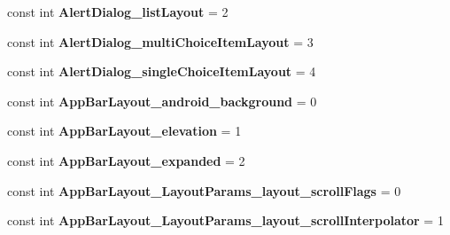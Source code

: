 \begin{DoxyCompactItemize}
const int {\bfseries Alert\+Dialog\+\_\+list\+Layout} = 2
\item 
\mbox{\label{class_pinned_app_1_1_droid_1_1_resource_1_1_styleable_a93ac112199ce966f3d5c18b827046583}} 
const int {\bfseries Alert\+Dialog\+\_\+multi\+Choice\+Item\+Layout} = 3
\item 
\mbox{\label{class_pinned_app_1_1_droid_1_1_resource_1_1_styleable_a029237b26ce7a9d43ef91b2c71e17096}} 
const int {\bfseries Alert\+Dialog\+\_\+single\+Choice\+Item\+Layout} = 4
\item 
\mbox{\label{class_pinned_app_1_1_droid_1_1_resource_1_1_styleable_a166de2ec6d41e133a29dd1f6f6a45105}} 
const int {\bfseries App\+Bar\+Layout\+\_\+android\+\_\+background} = 0
\item 
\mbox{\label{class_pinned_app_1_1_droid_1_1_resource_1_1_styleable_a7200719823d9acf1133a2ede53ee3799}} 
const int {\bfseries App\+Bar\+Layout\+\_\+elevation} = 1
\item 
\mbox{\label{class_pinned_app_1_1_droid_1_1_resource_1_1_styleable_ac9b6efbf85274c76d26a396848e81475}} 
const int {\bfseries App\+Bar\+Layout\+\_\+expanded} = 2
\item 
\mbox{\label{class_pinned_app_1_1_droid_1_1_resource_1_1_styleable_ae0e485c59b448da41843ef480c3b6c11}} 
const int {\bfseries App\+Bar\+Layout\+\_\+\+Layout\+Params\+\_\+layout\+\_\+scroll\+Flags} = 0
\item 
\mbox{\label{class_pinned_app_1_1_droid_1_1_resource_1_1_styleable_a1c9f435801e009582dd3b9c87c2d86ed}} 
const int {\bfseries App\+Bar\+Layout\+\_\+\+Layout\+Params\+\_\+layout\+\_\+scroll\+Interpolator} = 1
\item 
\mbox{\label{class_pinned_app_1_1_droid_1_1_resource_1_1_styleable_a46acd16f46f63a05e201423f2980dafa}} 

\end{DoxyCompactItemize}
